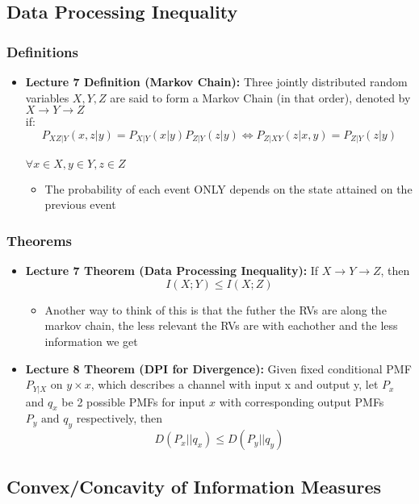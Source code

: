 \documentclass{article}
\begin{document}
\subsection{Data Processing Inequality}
\subsubsection{Definitions}
\begin{itemize}
    \item \textbf{Lecture 7 Definition (Markov Chain):} Three jointly distributed random variables \(X,Y,Z\) are said to form a Markov Chain (in that order), denoted by \(X \to Y \to Z\)
    \\if:
    \[P_{XZ|Y}(x,z|y) = P_{X|Y}(x|y) P_{Z|Y}(z|y) \Longleftrightarrow P_{Z|XY}(z|x,y) = P_{Z|Y}(z|y)\]
    \\ \(\forall x \in X, y \in Y, z \in Z\)
    \\
    \begin{itemize}
        \item The probability of each event ONLY depends on the state attained on the previous event
    \end{itemize}
\end{itemize}
\subsubsection{Theorems}
\begin{itemize}
    \item \textbf{Lecture 7 Theorem (Data Processing Inequality):} If \(X \to Y \to Z\), then 
    \[I(X;Y) \leq I(X;Z)\]
    \begin{itemize}
        \item Another way to think of this is that the futher the RVs are along the markov chain, the less relevant the RVs are with eachother and the less information we get
    \end{itemize}
    \item \textbf{Lecture 8 Theorem (DPI for Divergence):} Given fixed conditional PMF \(P_{Y|X}\) on \(y \times x\), which describes a channel with input x and output y,
    let \(P_x\) and \(q_x\) be 2 possible PMFs for input \(x\) with corresponding output PMFs \(P_y \text{ and } q_y\) respectively, then
    \[D(P_x||q_x) \leq D(P_y||q_y)\]
\end{itemize}

\subsection{Convex/Concavity of Information Measures}
\end{document}
